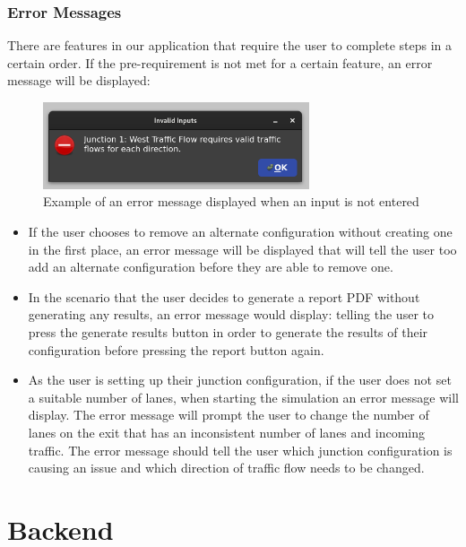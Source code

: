 \documentclass{article}
\begin{document}
    \subsubsection{Error Messages}
    There are features in our application that require the user to complete steps in a certain order.
    If the pre-requirement is not met for a certain feature, an error message will be displayed:

    \begin{figure}[H]
        \centering
        \includegraphics[width=0.7\textwidth]{example_error}
        \caption{Example of an error message displayed when an input is not entered}
        \label{fig:sampleError}
    \end{figure}

    \begin{itemize}
        \item If the user chooses to remove an alternate configuration without creating one in the first place, an error message will be displayed that will tell the user too add an alternate configuration before they are able to remove one.
        \item In the scenario that the user decides to generate a report PDF without generating any results, an error message would display: telling the user to press the generate results button in order to generate the results of their configuration before pressing the report button again.
        \item As the user is setting up their junction configuration, if the user does not set a suitable number of lanes, when starting the simulation an error message will display. The error message will prompt the user to change the number of lanes on the exit that has an inconsistent number of lanes and incoming traffic. The error message should tell the user which junction configuration is causing an issue and which direction of traffic flow needs to be changed.
    \end{itemize}

    \section{Backend}
\end{document}
